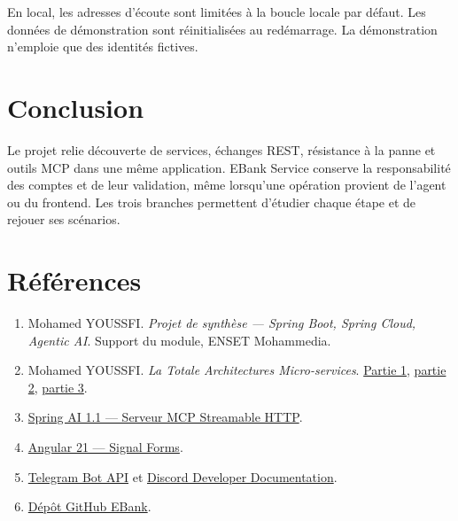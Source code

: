 \documentclass[11pt,a4paper]{article}
\begin{document}
En local, les adresses d'écoute sont limitées à la boucle locale par défaut. Les données de démonstration sont réinitialisées au redémarrage. La démonstration n'emploie que des identités fictives.

\section{Conclusion}
Le projet relie découverte de services, échanges REST, résistance à la panne et outils MCP dans une même application. EBank Service conserve la responsabilité des comptes et de leur validation, même lorsqu'une opération provient de l'agent ou du frontend. Les trois branches permettent d'étudier chaque étape et de rejouer ses scénarios.

\section*{Références}
\begin{enumerate}
\item Mohamed YOUSSFI. \textit{Projet de synthèse — Spring Boot, Spring Cloud, Agentic AI}. Support du module, ENSET Mohammedia.
\item Mohamed YOUSSFI. \textit{La Totale Architectures Micro-services}. \href{https://www.youtube.com/watch?v=cdFz3VemT1Q}{Partie 1}, \href{https://www.youtube.com/watch?v=JHvxSZTWSsY}{partie 2}, \href{https://www.youtube.com/watch?v=wDheR7_2jkQ}{partie 3}.
\item \href{https://docs.spring.io/spring-ai/reference/1.1/api/mcp/mcp-streamable-http-server-boot-starter-docs.html}{Spring AI 1.1 — Serveur MCP Streamable HTTP}.
\item \href{https://v21.angular.dev/guide/forms/signals/form-logic}{Angular 21 — Signal Forms}.
\item \href{https://core.telegram.org/bots/api}{Telegram Bot API} et \href{https://docs.discord.com/developers/events/gateway}{Discord Developer Documentation}.
\item \href{https://github.com/Marouanemounir/Project-Distributed-Systems}{Dépôt GitHub EBank}.
\end{enumerate}
\end{document}
